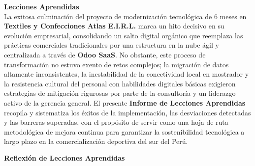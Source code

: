 \documentclass[11pt]{article}
\begin{document}
\textbf{Lecciones Aprendidas}\\
La exitosa culminación del proyecto de modernización tecnológica de 6 meses en \textbf{Textiles y Confecciones Atlas E.I.R.L.} marca un hito decisivo en su evolución empresarial, consolidando un salto digital orgánico que reemplaza las prácticas comerciales tradicionales por una estructura en la nube ágil y centralizada a través de \textbf{Odoo SaaS}. No obstante, este proceso de transformación no estuvo exento de retos complejos; la migración de datos altamente inconsistentes, la inestabilidad de la conectividad local en mostrador y la resistencia cultural del personal con habilidades digitales básicas exigieron estrategias de mitigación rigurosas por parte de la consultoría y un liderazgo activo de la gerencia general. El presente \textbf{Informe de Lecciones Aprendidas} recopila y sistematiza los éxitos de la implementación, las desviaciones detectadas y las barreras superadas, con el propósito de servir como una hoja de ruta metodológica de mejora continua para garantizar la sostenibilidad tecnológica a largo plazo en la comercialización deportiva del sur del Perú.

\newpage
\textbf{Reflexión de Lecciones Aprendidas}
\end{document}

